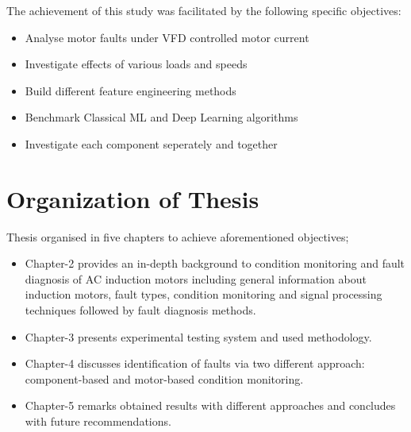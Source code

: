 The achievement of this study was facilitated by the following specific objectives:
\begin{itemize}
\item Analyse motor faults under VFD controlled motor current
\item Investigate effects of various loads and speeds
\item Build different feature engineering methods 
\item Benchmark Classical ML and Deep Learning algorithms
\item Investigate each component seperately and together
\end{itemize}

\section{Organization of Thesis}
\label{organization}

Thesis organised in five chapters to achieve aforementioned objectives;
\begin{itemize}
\item Chapter-2 provides an in-depth background to condition monitoring and fault diagnosis of AC induction motors including general information about induction motors, fault types, condition monitoring and signal processing techniques followed by fault diagnosis methods.

\item Chapter-3 presents experimental testing system and used methodology.

\item Chapter-4 discusses identification of faults via two different approach: component-based and motor-based condition monitoring.

\item Chapter-5 remarks obtained results with different approaches and concludes with future recommendations.

\end{itemize}